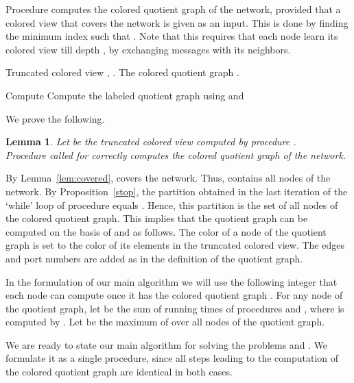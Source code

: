 \documentclass[a4paper,10pt]{article}
\newtheorem{lemma}{Lemma}[section]
\newenvironment{proof}[1][Proof]
{\par\noindent{\bf #1:} }{\hspace*{\fill}\nolinebreak{}\bigskip\par}
\begin{document}
\medskip
Procedure  computes the colored quotient graph  of the network, provided that a colored view  that covers the network is given as an input.
This is done by finding the minimum index  such that .
Note that this requires that each node learn its colored view till depth , by exchanging messages with its neighbors.
\begin{algorithm} \caption{}
\label{alg:ComputeQuotientGraph}
\begin{algorithmic}
\REQUIRE Truncated colored view , .
\ENSURE  The colored quotient graph .

\STATE 
\STATE 
\STATE 
\WHILE{}
   \STATE 
   \STATE 
   \STATE Compute 
\ENDWHILE
\STATE Compute the labeled quotient graph  using  and 
\RETURN 
\end{algorithmic}
\end{algorithm}

We prove the following.
\begin{lemma} \label{lem:computeQG}
Let  be the truncated colored view  computed by procedure .\\
Procedure  called for  correctly computes the colored quotient graph of the network.
\end{lemma}
\begin{proof}
By Lemma~\ref{lem:covered},  covers the network.
Thus,  contains all nodes of the network.
By Proposition~\ref{stop}, the partition  obtained in the last iteration of the `while' loop of procedure  equals .
Hence, this partition  is the set of all nodes of the colored quotient graph.
This implies that the quotient graph can be computed on the basis of  and  as follows.
The color of a node of the quotient graph is set to the color of its elements in the truncated colored view.
The edges and port numbers are added as in the definition of the quotient graph.
\end{proof}


In the formulation of our main algorithm we will use the following integer that each node can compute once it has the colored quotient graph .
For any node  of the quotient graph, let  be the sum of running times of procedures  and , where  is computed by .
Let  be the maximum of  over all nodes  of the quotient graph.

We are ready to state our main algorithm for solving the problems  and .
We formulate it as a single procedure, since all steps leading to the computation of the colored quotient graph are identical in both cases.
\end{document}

